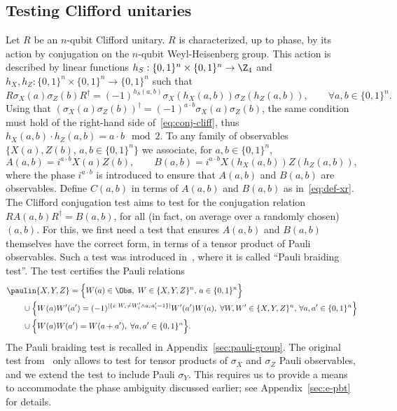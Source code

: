 \subsection{Testing Clifford unitaries}
\label{sec:n-clifford}

Let $R$ be an $n$-qubit Clifford unitary. $R$ is characterized, up to phase, by its action by conjugation on the $n$-qubit Weyl-Heisenberg group. This action is described  by linear functions $h_S:\{0,1\}^n\times\{0,1\}^n \to \Z_4$ and $h_X,h_Z:\{0,1\}^n\times\{0,1\}^n \to \{0,1\}^n$ such that
\begin{equation}\label{eq:conj-cliff}
R \sigma_X(a)\sigma_Z(b) R^\dagger = (-1)^{h_S(a,b)}\sigma_X(h_X(a,b))\sigma_Z(h_Z(a,b)),\qquad\forall a,b\in\{0,1\}^n.
\end{equation}
Using that $(\sigma_X(a)\sigma_Z(b))^\dagger = (-1)^{a\cdot b} \sigma_X(a)\sigma_Z(b)$, the same condition must hold of the right-hand side of~\eqref{eq:conj-cliff}, thus $h_X(a,b)\cdot h_Z(a,b) = a\cdot b\mod 2$. 
 To any family of observables $\{X(a),Z(b),\,a,b\in\{0,1\}^n\}$ we associate,  for $a,b\in\{0,1\}^n$,
\begin{equation}\label{eq:def-control-c}
A(a,b) = i^{a\cdot b}X(a)Z(b), \qquad B(a,b) = i^{a\cdot b}X(h_X(a,b))Z(h_Z(a,b)),
\end{equation}
where the phase $i^{a\cdot b}$ is introduced to ensure that $A(a,b)$ and $B(a,b)$ are observables. Define $C(a,b)$ in terms of $A(a,b)$ and $B(a,b)$ as in~\eqref{eq:def-xr}. 
The Clifford conjugation test aims to test for the conjugation relation $RA(a,b)R^\dagger = B(a,b)$, for all (in fact, on average over a randomly chosen) $(a,b)$. For this, we first need a test that ensures $A(a,b)$ and $B(a,b)$ themselves have the correct form, in terms of a tensor product of Pauli observables. Such a test was introduced in~\cite{natarajan2016robust}, where it is called ``Pauli braiding test''. The test certifies the Pauli relations 
\begin{align*}
& {\paulin}\{X,Y,Z\} = \Big\{ W(a)\in\Obs,\;W \in \{X,Y,Z\}^n,\,a\in\{0,1\}^n\Big\} \\
&\qquad\cup \Big\{W(a)W'(a')=(-1)^{|\{i:\,W_i\neq W'_i \wedge a_ia'_i=1\}|} W'(a')W(a),\;\forall W,W' \in \{X,Y,Z\}^n,\,\forall a,a'\in\{0,1\}^n\Big\}\\
&\qquad \cup\Big\{ W(a)W(a')=W(a+a'),\;\forall a,a'\in\{0,1\}^n\Big\}.
\end{align*}
The Pauli braiding test is recalled in Appendix~\ref{sec:pauli-group}. The original test from~\cite{natarajan2016robust} only allows to test for tensor products of $\sigma_X$ and $\sigma_Z$ Pauli observables, and we extend the test to include Pauli $\sigma_Y$. This requires us to provide a means to accommodate the phase ambiguity discussed earlier; see Appendix~\ref{sec:e-pbt} for details. 

